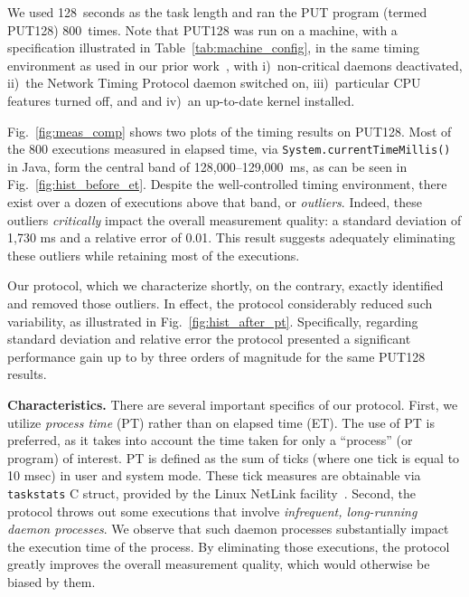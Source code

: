 \documentclass[letter]{ieice}
\begin{document}
We used 128~seconds as the task length and ran the PUT program (termed PUT128) 
800~times. {\color{blue}Note that PUT128 was run on a machine, with 
a specification illustrated in Table~\ref{tab:machine_config}, 
in the same timing environment as used in our prior work~\cite{Currim}, 
with i)~non-critical daemons deactivated, 
ii)~the Network Timing Protocol daemon switched on,  
iii)~particular CPU features\cite{intel15,intelSpeed15} turned off, and 
and iv)~an up-to-date kernel installed.} 

{\color{blue}Fig.~\ref{fig:meas_comp} shows two plots of the timing results on PUT128.
Most of the 800 executions measured in elapsed time, 
via  {\tt System.currentTimeMillis()} in Java, form the central band 
of \hbox{128,000--129,000 ms,} as can be seen in Fig.~\ref{fig:hist_before_et}. 
Despite the well-controlled timing environment, there exist over a dozen of executions above that band, or {\em outliers}. Indeed, these outliers {\em critically} impact the overall measurement quality: a standard deviation of 1,730 ms and a relative error of 0.01. This result suggests adequately eliminating these outliers while retaining most of the executions.}

{\color{blue}
Our protocol, which we characterize shortly, on the contrary, 
exactly identified and removed those outliers. 
In effect, the protocol considerably reduced such variability, 
as illustrated in Fig.~\ref{fig:hist_after_pt}. 
Specifically, regarding standard deviation and relative error 
the protocol presented a significant performance gain up to by 
three orders of magnitude for the same PUT128 results.
}

{\color{blue}
{\bf Characteristics.} There are several important specifics of our protocol. 
First, we utilize {\em process time} (PT) rather than on elapsed time (ET). 
The use of PT is preferred, as it takes into account 
the time taken for only a ``process'' (or program) of interest.
PT is defined as the sum of ticks (where one tick is equal to 10 msec)
in user and system mode. 
These tick measures are obtainable via {\tt taskstats} C struct, 
provided by the Linux NetLink facility~\cite{Netlink}. 
Second, the protocol throws out some executions that involve
{\em infrequent, \hbox{long-running} daemon processes}. 
We observe that such daemon processes substantially impact 
the execution time of the process.  
By eliminating those executions, the protocol greatly improves
the overall measurement quality, which would otherwise be biased by them.
}
\end{document}
